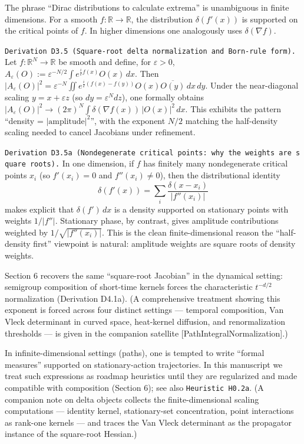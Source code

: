 \documentclass[
]{article}
\begin{document}
The phrase ``Dirac distributions to calculate extrema'' is unambiguous
in finite dimensions. For a smooth \(f:\mathbb R\to\mathbb R\), the
distribution \(\delta(f'(x))\) is supported on the critical points of
\(f\). In higher dimensions one analogously uses \(\delta(\nabla f)\).

\texttt{Derivation\ D3.5\ (Square-root\ delta\ normalization\ and\ Born-rule\ form).}
Let \(f:\mathbb R^N\to\mathbb R\) be smooth and define, for
\(\varepsilon>0\),
\(A_\varepsilon(O):=\varepsilon^{-N/2}\int e^{\frac{i}{\varepsilon}f(x)}O(x)\,dx\).
Then
\(|A_\varepsilon(O)|^2=\varepsilon^{-N}\iint e^{\frac{i}{\varepsilon}(f(x)-f(y))}O(x)\overline{O(y)}\,dx\,dy\).
Under the near-diagonal scaling \(y=x+\varepsilon z\) (so
\(dy=\varepsilon^Ndz\)), one formally obtains
\(|A_\varepsilon(O)|^2\to (2\pi)^N\int \delta(\nabla f(x))\,|O(x)|^2\,dx\).
This exhibits the pattern ``density = \(|\text{amplitude}|^2\)'', with
the exponent \(N/2\) matching the half-density scaling needed to cancel
Jacobians under refinement.

\texttt{Derivation\ D3.5a\ (Nondegenerate\ critical\ points:\ why\ the\ weights\ are\ square\ roots).}
In one dimension, if \(f\) has finitely many nondegenerate critical
points \(x_i\) (so \(f'(x_i)=0\) and \(f''(x_i)\neq 0\)), then the
distributional identity \[
\delta(f'(x))=\sum_i \frac{\delta(x-x_i)}{|f''(x_i)|}
\] makes explicit that \(\delta(f')\,dx\) is a density supported on
stationary points with weights \(1/|f''|\). Stationary phase, by
contrast, gives amplitude contributions weighted by
\(1/\sqrt{|f''(x_i)|}\). This is the clean finite-dimensional reason the
``half-density first'' viewpoint is natural: amplitude weights are
square roots of density weights.

Section 6 recovers the same ``square-root Jacobian'' in the dynamical
setting: semigroup composition of short-time kernels forces the
characteristic \(t^{-d/2}\) normalization (Derivation D4.1a). (A
comprehensive treatment showing this exponent is forced across four
distinct settings --- temporal composition, Van Vleck determinant in
curved space, heat-kernel diffusion, and renormalization thresholds ---
is given in the companion satellite {[}PathIntegralNormalization{]}.)

In infinite-dimensional settings (paths), one is tempted to write
``formal measures'' supported on stationary-action trajectories. In this
manuscript we treat such expressions as roadmap heuristics until they
are regularized and made compatible with composition (Section 6); see
also \texttt{Heuristic\ H0.2a}. (A companion note on delta objects
collects the finite-dimensional scaling computations --- identity
kernel, stationary-set concentration, point interactions as rank-one
kernels --- and traces the Van Vleck determinant as the propagator
instance of the square-root Hessian.)
\end{document}
